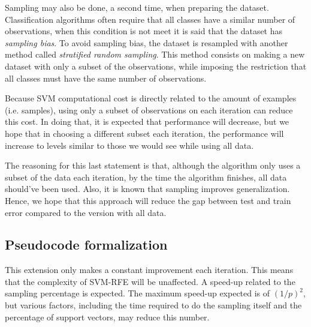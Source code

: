 Sampling may also be done, a second time, when preparing the dataset. Clas\-si\-fi\-cation algorithms often require that all classes have a similar number of ob\-ser\-va\-tions, when this condition is not meet it is said that the dataset has \emph{sampling bias}. To avoid sampling bias, the dataset is resampled with another method called \emph{stratified random sampling}. This method consists on making a new dataset with only a subset of the observations, while imposing the restriction that all classes must have the same number of observations.

Because SVM computational cost is directly related to the amount of examples (i.e. samples), using only a subset of observations on each iteration can reduce this cost. In doing that, it is expected that performance will decrease, but we hope that in choosing a different subset each iteration, the performance will increase to levels similar to those we would see while using all data.

The reasoning for this last statement is that, although the algorithm only uses a subset of the data each iteration, by the time the algorithm finishes, all data should've been used. Also, it is known that sampling improves generalization. Hence, we hope that this approach will reduce the gap between test and train error compared to the version with all data.

\subsection{Pseudocode formalization}

This extension only makes a constant improvement each iteration. This means that the complexity of SVM-RFE will be unaffected. A speed-up related to the sampling percentage is expected. The maximum speed-up expected is of $(1/p)^2$, but various factors, including the time required to do the sampling itself and the percentage of support vectors, may reduce this number.

